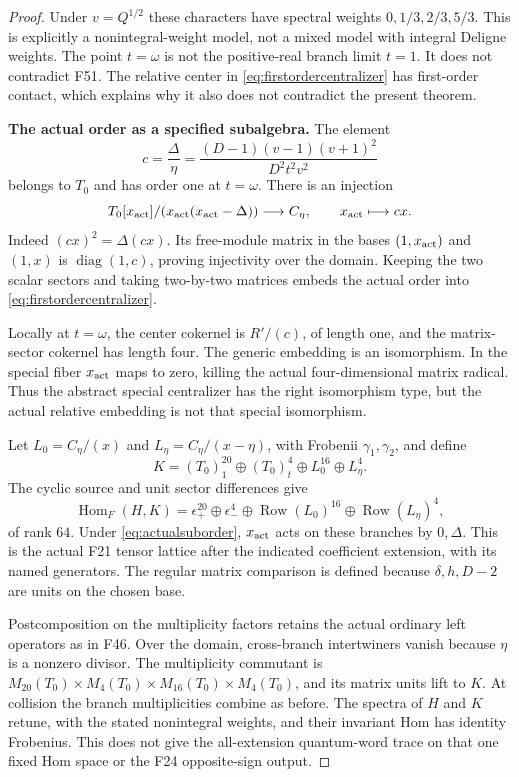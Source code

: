 \documentclass[11pt,a4paper]{article}
\newcommand{\fid}[1]{\textsf{#1}}\newcommand{\gate}[1]{\textsf{#1}}
\theoremstyle{named}\newtheorem{finding}{Finding}[section]
\theoremstyle{definition}\newtheorem{definition}[finding]{Definition}
\theoremstyle{remark}\newtheorem{remark}[finding]{Remark}
\begin{document}
\begin{proof}
Under $v=Q^{1/2}$ these characters have spectral
weights $0,1/3,2/3,5/3$.
This is explicitly a nonintegral-weight model,
not a mixed model with integral Deligne weights.
The point $t=\omega$ is not the positive-real
branch limit $t=1$.
It does not contradict \fid{F51}.
The relative center in
\eqref{eq:firstordercentralizer} has first-order
contact, which explains why it also does not
contradict the present theorem.

\par\smallskip\noindent\textbf{The actual order as a specified subalgebra.}\quad
The element
\[
 c=\frac{\Delta}{\eta}
   =\frac{(D-1)(v-1)(v+1)^2}{D^2t^2v^2}
\]
belongs to $T_0$ and has order one at $t=\omega$.
There is an injection
\begin{equation}\label{eq:actualsuborder}
 T_0[x_{\rm act}]/(x_{\rm act}(x_{\rm act}-\Delta))
   \longrightarrow C_\eta,\qquad x_{\rm act}\longmapsto cx.
\end{equation}
Indeed $(cx)^2=\Delta(cx)$.
Its free-module matrix in the bases $(1,x_{\rm act})$
and $(1,x)$ is $\operatorname{diag}(1,c)$, proving
injectivity over the domain.
Keeping the two scalar sectors and taking two-by-two
matrices embeds the actual order into
\eqref{eq:firstordercentralizer}.

Locally at $t=\omega$, the center cokernel is
$R'/(c)$, of length one, and the matrix-sector
cokernel has length four.
The generic embedding is an isomorphism.
In the special fiber $x_{\rm act}$ maps to zero,
killing the actual four-dimensional matrix radical.
Thus the abstract special centralizer has the right
isomorphism type, but the actual relative embedding
is not that special isomorphism.

Let $L_0=C_\eta/(x)$ and $L_\eta=C_\eta/(x-\eta)$,
with Frobenii $\gamma_1,\gamma_2$, and define
\[
 K=(T_0)_1^{20}\oplus(T_0)_t^4
       \oplus L_0^{16}\oplus L_\eta^4.
\]
The cyclic source and unit sector differences give
\[
 \operatorname{Hom}_F(H,K)
  =\epsilon_+^{20}\oplus\epsilon_-^4
       \oplus\operatorname{Row}(L_0)^{16}
       \oplus\operatorname{Row}(L_\eta)^4,
\]
of rank $64$.
Under \eqref{eq:actualsuborder}, $x_{\rm act}$ acts
on these branches by $0,\Delta$.
This is the actual \fid{F21} tensor lattice after
the indicated coefficient extension, with its named
generators. The regular matrix comparison is defined
because $\delta,h,D-2$ are units on the chosen base.

Postcomposition on the multiplicity factors retains
the actual ordinary left operators as in \fid{F46}.
Over the domain, cross-branch intertwiners vanish
because $\eta$ is a nonzero divisor.
The multiplicity commutant is
$M_{20}(T_0)\times M_4(T_0)\times
 M_{16}(T_0)\times M_4(T_0)$, and its matrix units
lift to $K$.
At collision the branch multiplicities combine as
before. The spectra of $H$ and $K$ retune, with the
stated nonintegral weights, and their invariant Hom
has identity Frobenius.
This does not give the all-extension quantum-word
trace on that one fixed Hom space or the
\fid{F24} opposite-sign output.


\end{proof}
\end{document}
